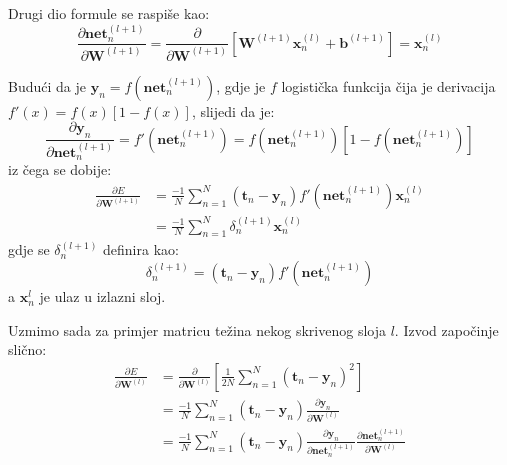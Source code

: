\documentclass[times, utf8, diplomski, numeric]{fer}
\begin{document}
Drugi dio formule se raspiše kao:
\begin{equation}  %
\label{eq:parc_net_over_parc_w}
  \frac{\partial \boldsymbol{net}_n^{(l+1)}}{\partial \boldsymbol{W}^{(l+1)}}
    = \frac{\partial}{\partial \boldsymbol{W}^{(l+1)}} \left[ \boldsymbol{W}^{(l+1)} \boldsymbol{x}_n^{(l)} + \boldsymbol{b}^{(l+1)} \right]
    = \boldsymbol{x}_n^{(l)}
\end{equation}

Budući da je $\boldsymbol{y}_n = f(\boldsymbol{net}_n^{(l+1)} )$, gdje je $f$ logistička funkcija čija je derivacija $f'(x) = f(x) [1 - f(x) ]$, slijedi da je:
\begin{equation} %
  \frac{\partial \boldsymbol{y}_n}{\partial \boldsymbol{net}_n^{(l+1)}}
    = f'\left(\boldsymbol{net}_n^{(l+1)}\right)
    = f\left(\boldsymbol{net}_n^{(l+1)}\right) \left[ 1 - f\left(\boldsymbol{net}_n^{(l+1)}\right) \right]
\end{equation}
iz čega se dobije:
\begin{equation}
\begin{split}
  \frac{\partial E}{\partial \boldsymbol{W}^{(l+1)}}
    &= \frac{-1}{N} \sum_{n=1}^{N} \left( \boldsymbol{t}_{n} - \boldsymbol{y}_{n} \right) f'\left(\boldsymbol{net}_n^{(l+1)}\right) \boldsymbol{x}_n^{(l)} \\
    &= \frac{-1}{N} \sum_{n=1}^{N} \delta_n^{(l+1)} \boldsymbol{x}_n^{(l)}
\end{split}
\end{equation} %
gdje se $\delta_n^{(l+1)}$ definira kao:
\begin{equation} 
\label{eq:delta_lastlayer}
  \delta_n^{(l+1)}
    = \left( \boldsymbol{t}_{n} - \boldsymbol{y}_{n} \right) f'\left(\boldsymbol{net}_n^{(l+1)}\right)
\end{equation}
a $\boldsymbol{x}_n^{l}$ je ulaz u izlazni sloj.

Uzmimo sada za primjer matricu težina nekog skrivenog sloja $l$. Izvod započinje slično:
\begin{equation} %
\label{eq:e_over_w_hidden_layer}
\begin{split}
  \frac{\partial E}{\partial \boldsymbol{W}^{(l)}}
    &= \frac{\partial}{\partial \boldsymbol{W}^{(l)}} \left[ \frac{1}{2N} \sum_{n=1}^{N} \left( \boldsymbol{t}_{n} - \boldsymbol{y}_{n} \right)^2 \right] \\
    &= \frac{-1}{N} \sum_{n=1}^{N} \left( \boldsymbol{t}_{n} - \boldsymbol{y}_{n} \right) \frac{\partial \boldsymbol{y}_n}{\partial \boldsymbol{W}^{(l)}} \\
    &= \frac{-1}{N} \sum_{n=1}^{N} \left( \boldsymbol{t}_{n} - \boldsymbol{y}_{n} \right) \frac{\partial \boldsymbol{y}_n}{\partial \boldsymbol{net}_n^{(l+1)}} \frac{\partial \boldsymbol{net}_n^{(l+1)}}{\partial \boldsymbol{W}^{(l)}}
\end{split}
\end{equation}
\end{document}
